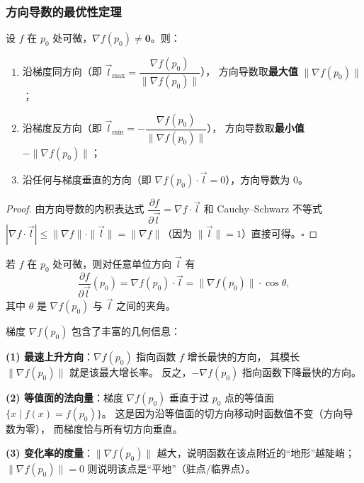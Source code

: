 \documentclass[lang=cn,11pt]{elegantbook}
\begin{document}
\subsubsection*{方向导数的最优性定理}

\begin{theorem}[梯度的最优性] \label{thm:gradient-max}
设 $f$ 在 $p_0$ 处可微，$\nabla f(p_0)\neq\boldsymbol 0$。则：
\begin{enumerate}
  \item 沿梯度同方向（即 $\vec l_{\max}=\dfrac{\nabla f(p_0)}{\| \nabla f(p_0)\|}$），
        方向导数取\textbf{最大值} $\|\nabla f(p_0)\|$；
  \item 沿梯度反方向（即 $\vec l_{\min}=-\dfrac{\nabla f(p_0)}{\| \nabla f(p_0)\|}$），
        方向导数取\textbf{最小值} $-\|\nabla f(p_0)\|$；
  \item 沿任何与梯度垂直的方向（即 $\nabla f(p_0)\cdot\vec l=0$），方向导数为 $0$。
\end{enumerate}
\end{theorem}

\begin{proof}
由方向导数的内积表达式 $\dfrac{\partial f}{\partial\vec l}= \nabla f\cdot\vec l$
和 Cauchy--Schwarz 不等式
$|\nabla f\cdot\vec l|\leq\|\nabla f\|\cdot\|\vec l\|=\|\nabla f\|$（因为 $\|\vec l\|=1$）直接可得。\hfill$\square$
\end{proof}

\begin{corollary}[方向导数的统一公式] \label{cor:dir-grad-inner}
若 $f$ 在 $p_0$ 处可微，则对任意单位方向 $\vec l$ 有
\[
\frac{\partial f}{\partial\vec l}(p_0)= \nabla f(p_0)\cdot\vec l
=\|\nabla f(p_0)\|\cdot\cos\theta,
\]
其中 $\theta$ 是 $\nabla f(p_0)$ 与 $\vec l$ 之间的夹角。
\end{corollary}

\begin{remark}[梯度的几何意义] \label{remark:gradient-geometry}
梯度 $\nabla f(p_0)$ 包含了丰富的几何信息：

\textbf{(1) 最速上升方向}：$\nabla f(p_0)$ 指向函数 $f$ 增长最快的方向，
其模长 $\|\nabla f(p_0)\|$ 就是该最大增长率。
反之，$-\nabla f(p_0)$ 指向函数下降最快的方向。

\textbf{(2) 等值面的法向量}：梯度 $\nabla f(p_0)$ 垂直于过 $p_0$ 点的等值面
$\{x\mid f(x)=f(p_0)\}$。
这是因为沿等值面的切方向移动时函数值不变（方向导数为零），
而梯度恰与所有切方向垂直。

\textbf{(3) 变化率的度量}：$\|\nabla f(p_0)\|$ 越大，说明函数在该点附近的“地形”越陡峭；
$\|\nabla f(p_0)\|=0$ 则说明该点是“平地”（驻点/临界点）。
\end{remark}
\end{document}
